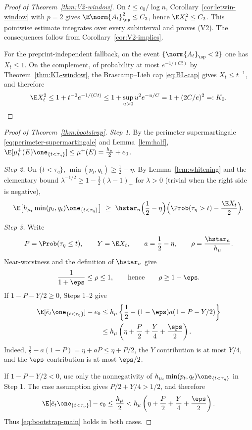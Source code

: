 \documentclass[../../main.tex]{subfiles}
\begin{document}
\begin{proof}[Proof of Theorem~\ref{thm:V2-window}]
On $t\le c_0/\log n$, Corollary~\ref{cor:letwin-window} with $p=2$ gives
$\E\norm{A_t}_\op^2\le C_2$, hence $\E X_t^2\le C_2$. This pointwise estimate integrates over
every subinterval and proves \textup{(V2)}. The consequences follow from
Corollary~\ref{cor:V2-implies}.

For the preprint-independent fallback, on the event $\{\norm{A_t}_\op<2\}$ one has $X_t\le1$.
On the complement, of probability at most $e^{-1/(Ct)}$ by
Theorem~\ref{thm:KL-window}, the Brascamp--Lieb cap \eqref{eq:BL-cap} gives $X_t\le t^{-1}$,
and therefore
\[
  \E X_t^2\le1+t^{-2}e^{-1/(Ct)}\le1+\sup_{u>0}u^2e^{-u/C}=1+(2C/e)^2=:K_0 .
\]
\end{proof}

\begin{proof}[Proof of Theorem~\ref{thm:bootstrap}]
\emph{Step 1.} By the perimeter supermartingale \eqref{eq:perimeter-supermartingale} and
Lemma~\ref{lem:half},
$\E[\mu_t^+(E)\one_{\{t<\tau_\eta\}}]\le\mu^+(E)=\tfrac{h_\mu}2+e_0$.

\emph{Step 2.} On $\{t<\tau_\eta\}$, $\min(p_t,q_t)\ge\tfrac12-\eta$. By
Lemma~\ref{lem:whitening} and the elementary bound
$\lambda^{-1/2}\ge1-\tfrac12(\lambda-1)_+$ for $\lambda>0$ (trivial when the right side is
negative),
\[
  \E\bigl[h_{\mu_t}\min(p_t,q_t)\one_{\{t<\tau_\eta\}}\bigr]
  \ \ge\
  \hstar_n\Bigl(\frac12-\eta\Bigr)\Bigl(\Prob(\tau_\eta>t)-\frac{\E X_t}2\Bigr).
\]

\emph{Step 3.} Write
\[
  P=\Prob(\tau_\eta\le t),\qquad Y=\E X_t,\qquad
  a=\frac12-\eta,\qquad \rho=\frac{\hstar_n}{h_\mu}.
\]
Near-worstness and the definition of $\hstar_n$ give
\[
  \frac1{1+\eps}\le\rho\le1,
  \qquad\text{hence}\qquad \rho\ge1-\eps.
\]
If $1-P-Y/2\ge0$, Steps 1--2 give
\[
\begin{split}
  \E[\bar e_t\one_{\{t<\tau_\eta\}}]-e_0
  &\le h_\mu\left\{\frac12-(1-\eps)a(1-P-Y/2)\right\}\\
  &\le h_\mu\left(\eta+\frac P2+\frac Y4+\frac\eps2\right).
\end{split}
\]
Indeed, $\frac12-a(1-P)=\eta+aP\le\eta+P/2$, the $Y$ contribution is at most
$Y/4$, and the $\eps$ contribution is at most $\eps/2$.

If $1-P-Y/2<0$, use only the nonnegativity of
$h_{\mu_t}\min(p_t,q_t)\one_{\{t<\tau_\eta\}}$ in Step 1. The case assumption gives
$P/2+Y/4>1/2$, and therefore
\[
  \E[\bar e_t\one_{\{t<\tau_\eta\}}]-e_0
  \le\frac{h_\mu}{2}
  <h_\mu\left(\eta+\frac P2+\frac Y4+\frac\eps2\right).
\]
Thus \eqref{eq:bootstrap-main} holds in both cases.


\end{proof}
\end{document}
